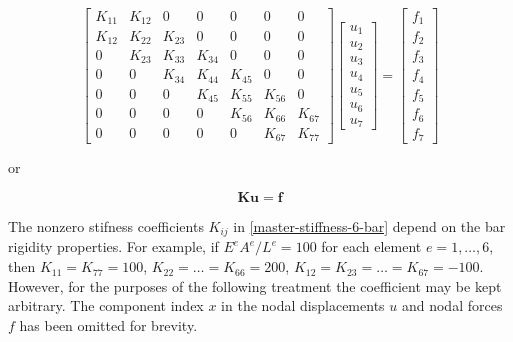 \documentclass[10pt,b5paper,titlepage]{book}
\newcommand{\m}{\mathbf}
\begin{document}
\begin{equation}\label{master-stiffness-6-bar}
    \begin{bmatrix}
        K_{11} & K_{12} & 0 & 0 & 0 & 0 & 0 \\
        K_{12} & K_{22} & K_{23} & 0 & 0 & 0 & 0 \\
        0 & K_{23} & K_{33} & K_{34} & 0 & 0 & 0 \\
        0 & 0 & K_{34} & K_{44} & K_{45} & 0 & 0 \\
        0 & 0 & 0 & K_{45} & K_{55} & K_{56} & 0 \\
        0 & 0 & 0 & 0 & K_{56} & K_{66} & K_{67} \\
        0 & 0 & 0 & 0 & 0 & K_{67} & K_{77}
    \end{bmatrix}
    \begin{bmatrix}
        u_1 \\
        u_2 \\
        u_3 \\
        u_4 \\
        u_5 \\
        u_6 \\
        u_7
    \end{bmatrix}
    = \begin{bmatrix}
        f_1 \\
        f_2 \\
        f_3 \\
        f_4 \\
        f_5 \\
        f_6 \\
        f_7
    \end{bmatrix}
\end{equation}

or

\begin{equation}\label{mfc-ms-master-equation}
    \m{K} \m{u} = \m{f}
\end{equation}

The nonzero stifness coefficients $ K_{ij} $ in \eqref{master-stiffness-6-bar}
depend on the bar rigidity properties. For example, if
$ E^e A^e / L^e = 100 $ for each element $ e = 1, \dots , 6 $, then
$ K_{11} = K_{77} = 100 $, $ K_{22} = \dots = K_{66} = 200 $,
$ K_{12} = K_{23} = \dots = K_{67} = -100 $. However, for the purposes of the
following treatment the coefficient may be kept arbitrary. The component index
$ x $ in the nodal displacements $ u $ and nodal forces $ f $ has been omitted
for brevity.
\end{document}
